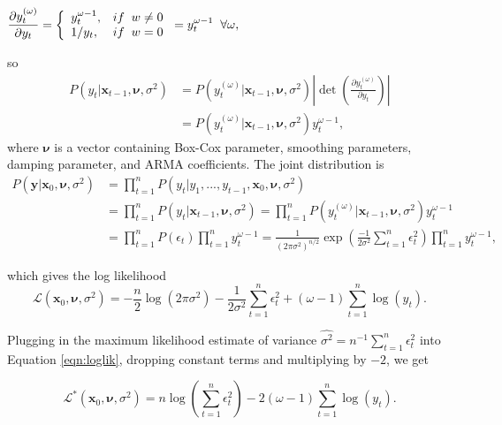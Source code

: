 \documentclass{uwstat572}
\begin{document}
\begin{center}
$\displaystyle \frac{\partial y_t^{(\omega)}}{ \partial  y_t }= \left\{
\begin{array}{l l}
y_t^{\omega-1}, & if \;\; w \neq 0\\
1/ y_t, & if\;\; w=0\\
\end{array} \right. =y_t^{\omega-1}\;\;  \forall \omega,$ 
\end{center}
so
\begin{align*}
\displaystyle P(y_t| \textbf{x}_{t-1}, \bm{\nu},\sigma^2)&=P(y_t^{(\omega)}| \textbf{x}_{t-1}, \bm{\nu},\sigma^2) \left| \det\left( \frac{\partial y_t^{(\omega)}}{ \partial  y_t }   \right) \right| \\
&= P(y_t^{(\omega)}| \textbf{x}_{t-1}, \bm{\nu},\sigma^2) y_t^{\omega-1},
\end{align*}
where $\bm{\nu}$ is a vector containing Box-Cox parameter, smoothing parameters, damping parameter, and ARMA coefficients. The joint distribution is
\begin{align*}
\displaystyle P(\textbf{y}| \textbf{x}_0, \bm{\nu},\sigma^2)&= \prod\limits_{t=1}^n P(y_t|y_1,...,y_{t-1},\textbf{x}_0, \bm{\nu},\sigma^2) \\
&= \displaystyle   \prod\limits_{t=1}^n P(y_t|\textbf{x}_{t-1}, \bm{\nu},\sigma^2)
= \displaystyle   \prod\limits_{t=1}^n  P(y_t^{(\omega)}| \textbf{x}_{t-1}, \bm{\nu},\sigma^2) y_t^{\omega-1} \\
&=\displaystyle   \prod\limits_{t=1}^n P(\epsilon_t)  \prod\limits_{t=1}^n y_t^{\omega-1}
=\displaystyle \frac{1}{(2\pi \sigma^2)^{n/2}} \exp \left(  \frac{-1}{2\sigma^2}  \sum\limits_{t=1}^n \epsilon_t^2 \right)   \prod\limits_{t=1}^n y_t^{\omega-1},
\end{align*}

\noindent which gives the log likelihood
\begin{equation}
\mathcal{L}(\textbf{x}_0, \bm{\nu},\sigma^2)=-\frac{n}{2} \log (2\pi \sigma^2) -\frac{1}{2\sigma^2} \sum\limits_{t=1}^n \epsilon_t^2 +(\omega-1) \sum\limits_{t=1}^n \log(y_t).
\label{eqn:loglik}
\end{equation}

\noindent Plugging in the maximum likelihood estimate of variance $\hat{\sigma^2}=n^{-1} \sum\limits_{t=1}^n \epsilon_t^2$ into Equation \ref{eqn:loglik}, dropping constant terms and multiplying by $-2$, we get

\begin{equation}
\mathcal{L}^{*}(\textbf{x}_0, \bm{\nu},\sigma^2)=n \log (\sum\limits_{t=1}^n \epsilon_t^2)-2(\omega-1) \sum\limits_{t=1}^n \log(y_t).
\label{eqn:objective}
\end{equation}
\end{document}
